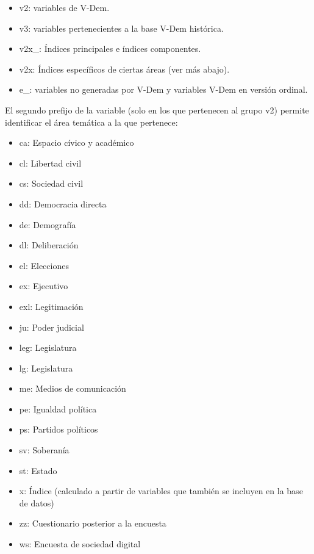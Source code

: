 \documentclass{article}
\begin{document}
\begin{itemize}
 \item v2: variables de V-Dem.
 \item v3: variables pertenecientes a la base V-Dem histórica.
 \item v2x\_: Índices principales e índices componentes.
 \item v2x: Índices específicos de ciertas 
 áreas (ver más abajo).
 \item e\_: variables no generadas por V-Dem y variables V-Dem en versión ordinal.
\end{itemize}

El segundo prefijo de la variable (solo en los que pertenecen al grupo v2) permite 
identificar el área temática a la que pertenece:

\begin{itemize}
 \item ca: Espacio cívico y académico
 \item cl: Libertad civil
 \item cs: Sociedad civil
 \item dd: Democracia directa
 \item de: Demografía
 \item dl: Deliberación
 \item el: Elecciones
 \item ex: Ejecutivo
 \item exl: Legitimación
 \item ju: Poder judicial
 \item leg: Legislatura
 \item lg: Legislatura
 \item me: Medios de comunicación
 \item pe: Igualdad política
 \item ps: Partidos políticos
 \item sv: Soberanía
 \item st: Estado
 \item x: Índice (calculado a partir de variables que también se 
 incluyen en la base de datos)
 \item zz: Cuestionario posterior a la encuesta
 \item ws: Encuesta de sociedad digital
\end{itemize}
\end{document}
